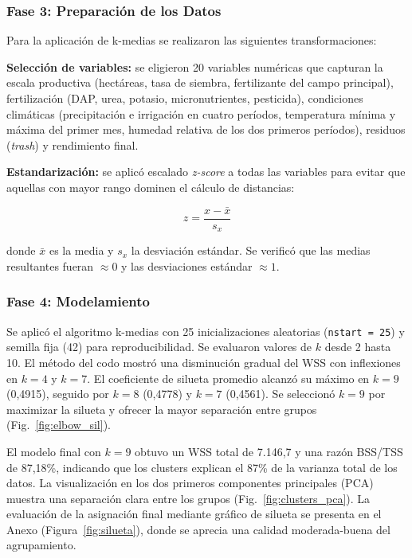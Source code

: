 \documentclass[10pt,a4paper]{article}
\begin{document}
\subsubsection{Fase 3: Preparación de los Datos}

Para la aplicación de k-medias se realizaron las siguientes transformaciones:

\textbf{Selección de variables:} se eligieron 20 variables numéricas que capturan la escala productiva (hectáreas, tasa de siembra, fertilizante del campo principal), fertilización (DAP, urea, potasio, micronutrientes, pesticida), condiciones climáticas (precipitación e irrigación en cuatro períodos, temperatura mínima y máxima del primer mes, humedad relativa de los dos primeros períodos), residuos (\textit{trash}) y rendimiento final.

\textbf{Estandarización:} se aplicó escalado \textit{z-score} a todas las variables para evitar que aquellas con mayor rango dominen el cálculo de distancias:

\begin{equation}
  z = \frac{x - \bar{x}}{s_x}
\end{equation}

donde $\bar{x}$ es la media y $s_x$ la desviación estándar. Se verificó que las medias resultantes fueran $\approx 0$ y las desviaciones estándar $\approx 1$.

\subsubsection{Fase 4: Modelamiento}

Se aplicó el algoritmo k-medias con 25 inicializaciones aleatorias (\texttt{nstart~=~25}) y semilla fija (42) para reproducibilidad. Se evaluaron valores de $k$ desde 2 hasta 10. El método del codo mostró una disminución gradual del WSS con inflexiones en $k = 4$ y $k = 7$. El coeficiente de silueta promedio alcanzó su máximo en $k = 9$ (0,4915), seguido por $k = 8$ (0,4778) y $k = 7$ (0,4561). Se seleccionó $k = 9$ por maximizar la silueta y ofrecer la mayor separación entre grupos (Fig.~\ref{fig:elbow_sil}).

El modelo final con $k = 9$ obtuvo un WSS total de 7.146,7 y una razón BSS/TSS de 87,18\%, indicando que los clusters explican el 87\% de la varianza total de los datos. La visualización en los dos primeros componentes principales (PCA) muestra una separación clara entre los grupos (Fig.~\ref{fig:clusters_pca}). La evaluación de la asignación final mediante gráfico de silueta se presenta en el Anexo (Figura~\ref{fig:silueta}), donde se aprecia una calidad moderada-buena del agrupamiento.
\end{document}
